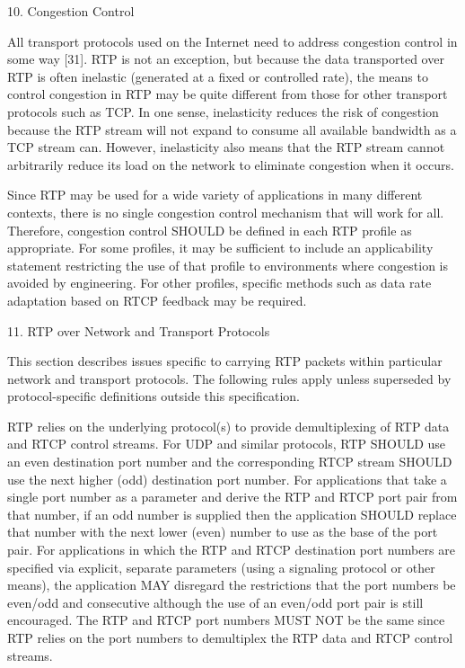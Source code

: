 \documentclass{article}
\begin{document}
10. Congestion Control

All transport protocols used on the Internet need to address congestion control in some way [31].  RTP is not an exception, but because the data transported over RTP is often inelastic (generated at a fixed or controlled rate), the means to control congestion in RTP may be quite different from those for other transport protocols such as TCP.  In one sense, inelasticity reduces the risk of congestion because the RTP stream will not expand to consume all available bandwidth as a TCP stream can.  However, inelasticity also means that the RTP stream cannot arbitrarily reduce its load on the network to eliminate congestion when it occurs.

Since RTP may be used for a wide variety of applications in many different contexts, there is no single congestion control mechanism that will work for all.  Therefore, congestion control SHOULD be defined in each RTP profile as appropriate.  For some profiles, it may be sufficient to include an applicability statement restricting the use of that profile to environments where congestion is avoided by engineering.  For other profiles, specific methods such as data rate adaptation based on RTCP feedback may be required.

11. RTP over Network and Transport Protocols

This section describes issues specific to carrying RTP packets within particular network and transport protocols.  The following rules apply unless superseded by protocol-specific definitions outside this specification.

RTP relies on the underlying protocol(s) to provide demultiplexing of RTP data and RTCP control streams.  For UDP and similar protocols, RTP SHOULD use an even destination port number and the corresponding RTCP stream SHOULD use the next higher (odd) destination port number. For applications that take a single port number as a parameter and derive the RTP and RTCP port pair from that number, if an odd number is supplied then the application SHOULD replace that number with the next lower (even) number to use as the base of the port pair.  For applications in which the RTP and RTCP destination port numbers are specified via explicit, separate parameters (using a signaling protocol or other means), the application MAY disregard the restrictions that the port numbers be even/odd and consecutive although the use of an even/odd port pair is still encouraged.  The RTP and RTCP port numbers MUST NOT be the same since RTP relies on the port numbers to demultiplex the RTP data and RTCP control streams.
\end{document}

